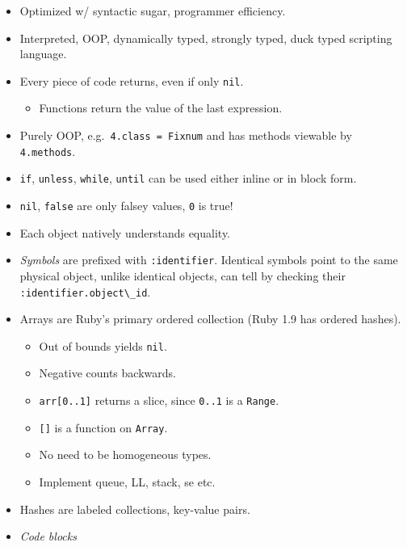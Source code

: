 \documentclass[10pt]{article}
\begin{document}
\begin{itemize}
    \item Optimized w/ syntactic sugar, programmer efficiency.
    \item Interpreted, OOP, dynamically typed, strongly typed, duck
        typed scripting language.
    \item Every piece of code returns, even if only \lstinline{nil}.
        \begin{itemize}
            \item Functions return the value of the last expression.
        \end{itemize}
    \item Purely OOP, e.g.\ \lstinline{4.class = Fixnum} and has methods viewable
        by \lstinline{4.methods}.
    \item \lstinline{if}, \lstinline{unless}, \lstinline{while}, \lstinline{until} can be
        used either inline or in block form.
    \item \lstinline{nil}, \lstinline{false} are only falsey values, \lstinline{0} is
        true!
    \item Each object natively understands equality.
    \item \emph{Symbols} are prefixed with \lstinline{:identifier}. Identical
        symbols point to the same physical object, unlike identical objects, can
        tell by checking their \lstinline{:identifier.object\_id}.
    \item Arrays are Ruby's primary ordered collection (Ruby 1.9 has ordered
        hashes).
        \begin{itemize}
            \item Out of bounds yields \lstinline{nil}.
            \item Negative counts backwards.
            \item \lstinline{arr[0..1]} returns a slice, since \lstinline{0..1} is a
                \lstinline{Range}.
            \item \lstinline{[]} is a function on \lstinline{Array}.
            \item No need to be homogeneous types.
            \item Implement queue, LL, stack, se etc.\@
        \end{itemize}
    \item Hashes are labeled collections, key-value pairs.
    \item \emph{Code blocks}
        \begin{itemize}

\end{itemize}
\end{itemize}
\end{document}
